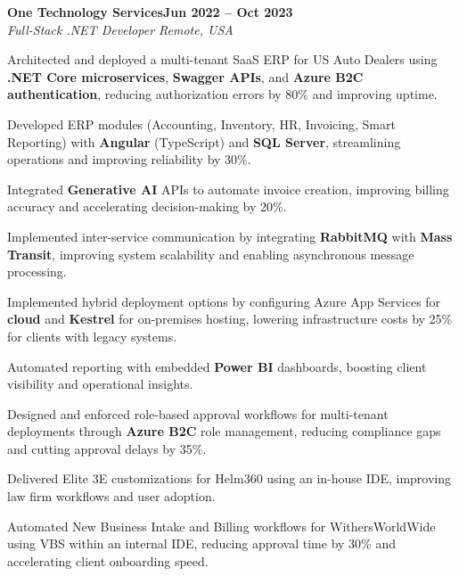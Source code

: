 \documentclass[letterpaper,10pt]{article}
\newcommand{\headingBf}[2]{
  \hspace{10pt}\textbf{#1}\hfill\textbf{#2}\\
}
\newcommand{\headingIt}[2]{
  \hspace{10pt}\textit{#1}\hfill\textit{#2}\\
}
\newenvironment{resume_list}{
  \vspace{-7pt}
  \begin{itemize}[itemsep=-2px, parsep=1pt, leftmargin=30pt]
}{
  \end{itemize}
}
\begin{document}
\headingBf{One Technology Services}{Jun 2022 -- Oct 2023}
\headingIt{Full-Stack .NET Developer \hfill Remote, USA}{}
\begin{resume_list}
    \item Architected and deployed a multi-tenant SaaS ERP for US Auto Dealers using \textbf{.NET Core microservices}, \textbf{Swagger APIs}, and \textbf{Azure B2C authentication}, reducing authorization errors by 80\% and improving uptime.
    \item Developed ERP modules (Accounting, Inventory, HR, Invoicing, Smart Reporting) with \textbf{Angular} (TypeScript) and \textbf{SQL Server}, streamlining operations and improving reliability by 30\%.
    \item Integrated \textbf{Generative AI} APIs to automate invoice creation, improving billing accuracy and accelerating decision-making by 20\%.
    \item Implemented inter-service communication by integrating \textbf{RabbitMQ} with \textbf{Mass Transit}, improving system scalability and enabling asynchronous message processing.
    \item Implemented hybrid deployment options by configuring Azure App Services for \textbf{cloud} and \textbf{Kestrel} for on-premises hosting, lowering infrastructure costs by 25\% for clients with legacy systems.
    \item Automated reporting with embedded \textbf{Power BI} dashboards, boosting client visibility and operational insights.   
    \item Designed and enforced role-based approval workflows for multi-tenant deployments through \textbf{Azure B2C} role management, reducing compliance gaps and cutting approval delays by 35\%.
    \item Delivered Elite 3E customizations for Helm360 using an in-house IDE, improving law firm workflows and user adoption.
    \item Automated New Business Intake and Billing workflows for WithersWorldWide using VBS within an internal IDE, reducing approval time by 30\% and accelerating client onboarding speed.
\end{resume_list}
\end{document}
